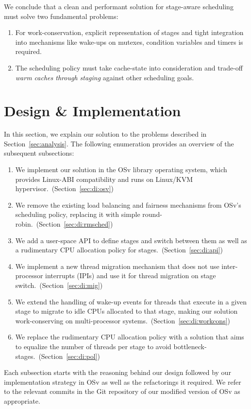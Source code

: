 \documentclass[12pt,a4paper]{article}
\begin{document}
We conclude that a clean and performant solution for stage-aware scheduling must solve two fundamental problems:
\begin{enumerate}
    \item For work-conservation, explicit representation of stages and tight integration into mechanisms like wake-ups on mutexes, condition variables and timers is required.
    \item The scheduling policy must take cache-state into consideration and trade-off \textit{warm caches through staging} against other scheduling goals.
\end{enumerate}

\clearpage
\section{Design \& Implementation}
In this section, we explain our solution to the problems described in Section~\ref{sec:analysis}.
The following enumeration provides an overview of the subsequent subsections:
\begin{enumerate}
    \item We implement our solution in the OSv library operating system, which provides Linux-ABI compatibility and runs on Linux/KVM hypervisor.~(Section~\ref{sec:di:osv})
    \item We remove the existing load balancing and fairness mechanisms from OSv's scheduling policy, replacing it with simple round-robin.~(Section~\ref{sec:di:rmsched})
    \item We add a user-space API to define stages and switch between them as well as a rudimentary CPU allocation policy for stages.~(Section~\ref{sec:di:api})
    \item We implement a new thread migration mechanism that does not use inter-processor interrupts (IPIs) and use it for thread migration on stage switch.~(Section~\ref{sec:di:mig})
    \item We extend the handling of wake-up events for threads that execute in a given stage to migrate to idle CPUs allocated to that stage, making our solution work-conserving on multi-processor systems.~(Section~\ref{sec:di:workcons})
    \item We replace the rudimentary CPU allocation policy with a solution that aims to equalize the number of threads per stage to avoid bottleneck-stages.~(Section~\ref{sec:di:pol})
\end{enumerate}
Each subsection starts with the reasoning behind our design followed by our implementation strategy in OSv as well as the refactorings it required.
We refer to the relevant commits in the Git repository of our modified version of OSv as appropriate.
\end{document}
